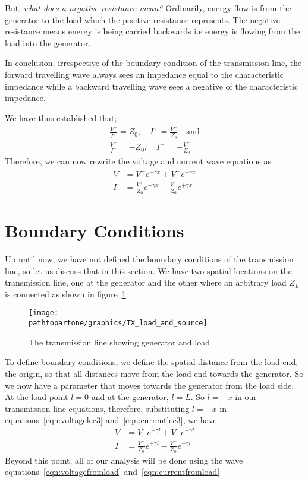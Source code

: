 But, \emph{what does a negative resistance mean?} Ordinarily, energy flow is from the generator to the load which the positive resistance represents. The negative resistance means energy is being carried backwards i.e energy is flowing from the load into the generator.

In conclusion, irrespective of the boundary condition of the transmission line, the forward travelling wave always sees an impedance equal to the characteristic impedance while a backward travelling wave sees a negative of the characteristic impedance.

We have thus established that;
\begin{align*}
\frac{V^+}{I^+} = Z_0,\quad I^+ = \frac{V^+}{Z_0}\quad\text{and}\\
\frac{V^-}{I^-} = -Z_0,\quad I^- = -\frac{V^-}{Z_0}
\end{align*}
Therefore, we can now rewrite the voltage and current wave equations as
\begin{align}
V &= V^+e^{-\gamma x}+V^-e^{+\gamma x}
\label{eqn:voltagelec3}\\
I &= \frac{V^+}{Z_0}e^{-\gamma x}-\frac{V^-}{Z_0}e^{+\gamma x}
\label{eqn:currentlec3}
\end{align}

\section{Boundary Conditions}
Up until now, we have not defined the boundary conditions of the transmission line, so let us discuss that in this section. We have two spatial locations on the transmission line, one at the generator and the other where an arbitrary load $Z_L$ is connected as shown in figure~\ref{fig:tlcircuit}.
\begin{figure}[h]
\centering
\texttt{[image: \\pathtopartone/graphics/TX\_load\_and\_source]}
\caption{The transmission line showing generator and load}
\label{fig:tlcircuit}
\end{figure}

To define boundary conditions, we define the spatial distance from the load end, the origin, so that all distances move from the load end towards the generator. So we now have a parameter that moves towards the generator from the load side. At the load point $l = 0$ and at the generator, $l = L$. So $l = -x$ in our transmission line equations, therefore, substituting $l = -x$ in equations~\ref{eqn:voltagelec3} and~\ref{eqn:currentlec3}, we have
\begin{align}
V &= V^+e^{+\gamma l}+V^-e^{-\gamma l}
\label{eqn:voltagefromload}\\
I &= \frac{V^+}{Z_0}e^{+\gamma l}-\frac{V^-}{Z_0}e^{-\gamma l}
\label{eqn:currentfromload}
\end{align}
Beyond this point, all of our analysis will be done using the wave equations~\eqref{eqn:voltagefromload} and~\eqref{eqn:currentfromload}

